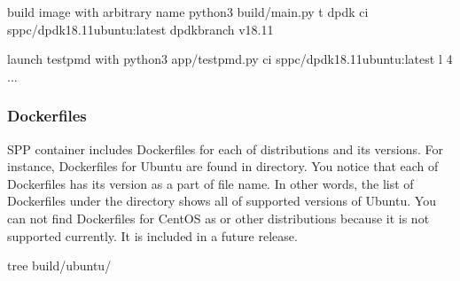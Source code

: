 \documentclass[a4paper,11pt,openany,oneside,english]{sphinxmanual}
\begin{document}
\begin{sphinxVerbatim}[commandchars=\\\{\},formatcom=\footnotesize]
 build image with arbitrary name
 python3 build/main.py \PYGZhy{}t dpdk \PYGZhy{}ci sppc/dpdk18.11\PYGZhy{}ubuntu:latest 
  \PYGZhy{}\PYGZhy{}dpdk\PYGZhy{}branch v18.11

 launch testpmd with 
 python3 app/testpmd.py \PYGZhy{}ci sppc/dpdk18.11\PYGZhy{}ubuntu:latest \PYGZhy{}l \PYGZhy{}4 ...
\end{sphinxVerbatim}


\subsubsection{Dockerfiles}
\label{\detokenize{tools/sppc/build_img:dockerfiles}}\label{\detokenize{tools/sppc/build_img:sppc-build-img-dockerfiles}}
SPP container includes Dockerfiles for each of distributions and
its versions.
For instance, Dockerfiles for Ubuntu are found in 
directory.
You notice that each of Dockerfiles has its version as a part of
file name.
In other words, the list of Dockerfiles under the  directory
shows all of supported versions of Ubuntu.
You can not find Dockerfiles for CentOS as  or other
distributions because it is not supported currently.
It is included in a future release.

\begin{sphinxVerbatim}[commandchars=\\\{\},formatcom=\footnotesize]
 tree build/ubuntu/
\end{sphinxVerbatim}
\end{document}
